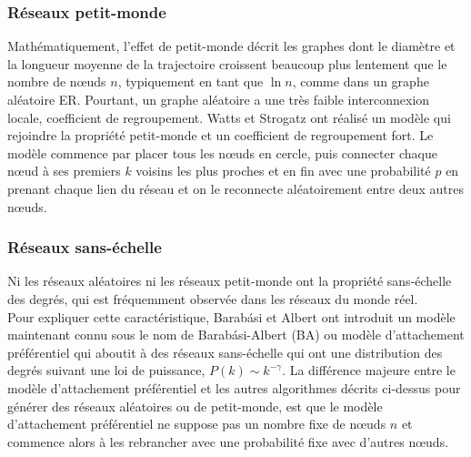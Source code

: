 \subsubsection{Réseaux petit-monde}
Mathématiquement, l'effet de petit-monde décrit les graphes dont le diamètre et la longueur moyenne de la trajectoire croissent beaucoup plus lentement que le nombre de nœuds $n$, typiquement en tant que $\ln n$, comme dans un graphe aléatoire ER. Pourtant, un graphe aléatoire a une très faible interconnexion locale, coefficient de regroupement. Watts et Strogatz \cite{Watss-Strogatz1998} ont réalisé un modèle qui rejoindre la propriété petit-monde et un coefficient de regroupement fort. Le modèle commence par placer tous les nœuds en cercle, puis connecter chaque nœud à ses premiers $k$ voisins les plus proches et en fin avec une probabilité $p$ en prenant chaque lien du réseau et on le reconnecte aléatoirement entre deux autres nœuds.
\subsubsection{Réseaux sans-échelle}
Ni les réseaux aléatoires ni les réseaux petit-monde ont la propriété sans-échelle des degrés, qui est fréquemment observée dans les réseaux du monde réel.\\
Pour expliquer cette caractéristique, Barab\'{a}si et Albert ont introduit un modèle maintenant connu sous le nom de Barab\'{a}si-Albert (BA) \cite{BA1999} ou modèle d'attachement préférentiel qui aboutit à des réseaux sans-échelle qui ont une distribution des degrés suivant une loi de puissance, $P(k)\sim k^{-\gamma}$. La différence majeure entre le modèle d'attachement préférentiel et les autres algorithmes décrits ci-dessus pour générer des réseaux aléatoires ou de petit-monde, est que le modèle d'attachement préférentiel ne suppose pas un nombre fixe de nœuds $n$ et commence alors à les rebrancher avec une probabilité fixe avec d'autres nœuds.

